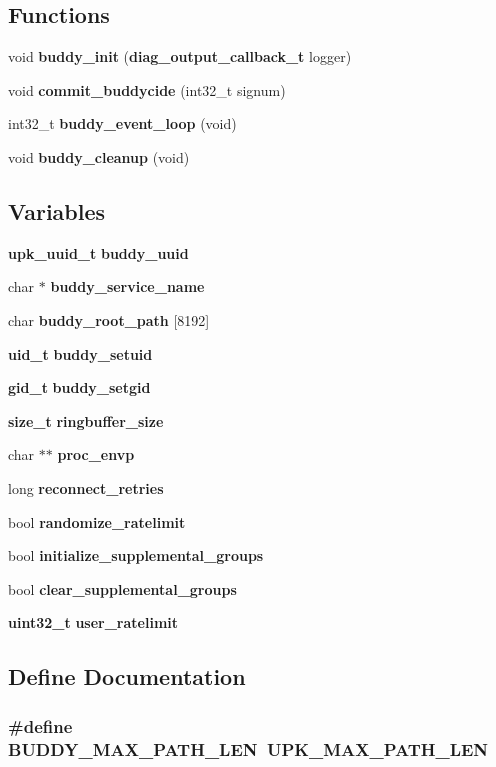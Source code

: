 \subsection*{Functions}
\begin{DoxyCompactItemize}
\item 
void {\bf buddy\_\-init} ({\bf diag\_\-output\_\-callback\_\-t} logger)
\item 
void {\bf commit\_\-buddycide} (int32\_\-t signum)
\item 
int32\_\-t {\bf buddy\_\-event\_\-loop} (void)
\item 
void {\bf buddy\_\-cleanup} (void)
\end{DoxyCompactItemize}
\subsection*{Variables}
\begin{DoxyCompactItemize}
\item 
{\bf upk\_\-uuid\_\-t} {\bf buddy\_\-uuid}
\item 
char $\ast$ {\bf buddy\_\-service\_\-name}
\item 
char {\bf buddy\_\-root\_\-path} [8192]
\item 
{\bf uid\_\-t} {\bf buddy\_\-setuid}
\item 
{\bf gid\_\-t} {\bf buddy\_\-setgid}
\item 
{\bf size\_\-t} {\bf ringbuffer\_\-size}
\item 
char $\ast$$\ast$ {\bf proc\_\-envp}
\item 
long {\bf reconnect\_\-retries}
\item 
bool {\bf randomize\_\-ratelimit}
\item 
bool {\bf initialize\_\-supplemental\_\-groups}
\item 
bool {\bf clear\_\-supplemental\_\-groups}
\item 
{\bf uint32\_\-t} {\bf user\_\-ratelimit}
\end{DoxyCompactItemize}


\subsection{Define Documentation}
\subsubsection[{BUDDY\_\-MAX\_\-PATH\_\-LEN}]{\setlength{\rightskip}{0pt plus 5cm}\#define BUDDY\_\-MAX\_\-PATH\_\-LEN~UPK\_\-MAX\_\-PATH\_\-LEN}\label{buddy_8h_a64b79a6c5e830efc3d0064b7d084988c}


